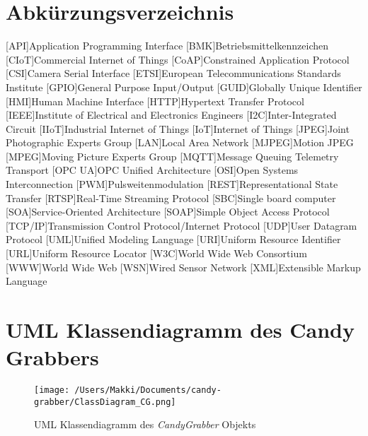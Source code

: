 \documentclass[BMR,Bachelor,ngerman]{twbook}%
\providecommand\listacroname{}
\renewcommand\listacroname{List of Abbreviations}
\renewcommand\listacroname{Abkürzungsverzeichnis}
\begin{document}
\chapter*{\listacroname}
\begin{acronym}[XXXXX]
	[API]{Application Programming Interface}
	[BMK]{Betriebsmittelkennzeichen}
	[CIoT]{Commercial Internet of Things}
	[CoAP]{Constrained Application Protocol}
	[CSI]{Camera Serial Interface}
	[ETSI]{European Telecommunications Standards Institute}
	[GPIO]{General Purpose Input/Output}
	[GUID]{Globally Unique Identifier}
	[HMI]{Human Machine Interface}
	[HTTP]{Hypertext Transfer Protocol}
	[IEEE]{Institute of Electrical and Electronics Engineers}
	[I2C]{Inter-Integrated Circuit}
	[IIoT]{Industrial Internet of Things}
	[IoT]{Internet of Things}
	[JPEG]{Joint Photographic Experts Group}
	[LAN]{Local Area Network}
	[MJPEG]{Motion JPEG}
	[MPEG]{Moving Picture Experts Group}
   	[MQTT]{Message Queuing Telemetry Transport}
	[OPC UA]{OPC Unified Architecture}
   	[OSI]{Open Systems Interconnection}
	[PWM]{Pulsweitenmodulation}
	[REST]{Representational State Transfer}
	[RTSP]{Real-Time Streaming Protocol}
	[SBC]{Single board computer}
   	[SOA]{Service-Oriented Architecture}
	[SOAP]{Simple Object Access Protocol}
   	[TCP/IP]{Transmission Control Protocol/Internet Protocol}
	[UDP]{User Datagram Protocol}
	[UML]{Unified Modeling Language}
	[URI]{Uniform Resource Identifier}
	[URL]{Uniform Resource Locator}
	[W3C]{World Wide Web Consortium}
   	[WWW]{World Wide Web}
   	[WSN]{Wired Sensor Network}
	[XML]{Extensible Markup Language}
\end{acronym}

%
%
\appendix
\chapter{UML Klassendiagramm des Candy Grabbers}
\begin{figure}[H]
\centering
\texttt{[image: /Users/Makki/Documents/candy-grabber/ClassDiagram\_CG.png]}
\caption{UML Klassendiagramm des \emph{CandyGrabber} Objekts}\label{fig:uml_class}
\end{figure}
%
\end{document}
